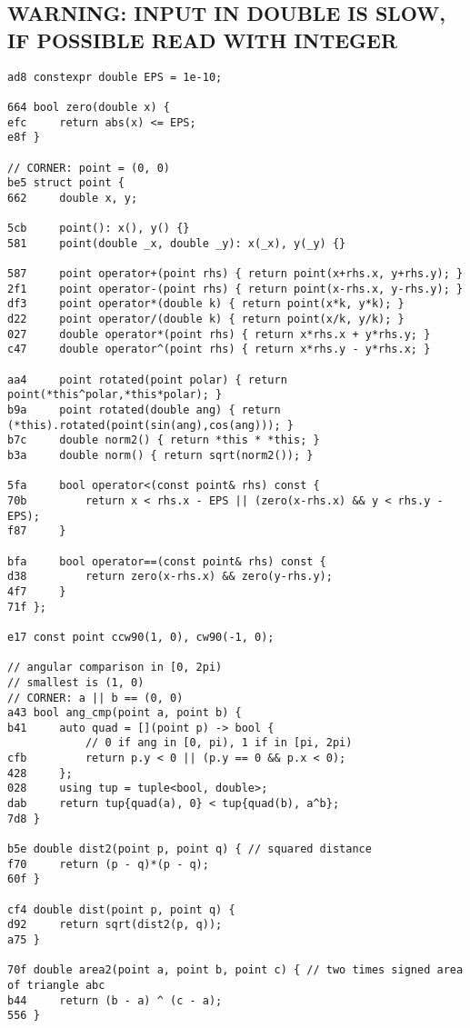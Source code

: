\documentclass[11pt, a4paper, twoside]{article}
\begin{document}
\subsection{WARNING: INPUT IN DOUBLE IS SLOW, IF POSSIBLE READ WITH INTEGER}
\begin{lstlisting}
ad8 constexpr double EPS = 1e-10;

664 bool zero(double x) {
efc 	return abs(x) <= EPS;
e8f }

// CORNER: point = (0, 0)
be5 struct point {
662 	double x, y;
    	
5cb 	point(): x(), y() {}
581 	point(double _x, double _y): x(_x), y(_y) {}
    	
587 	point operator+(point rhs) { return point(x+rhs.x, y+rhs.y); }
2f1 	point operator-(point rhs) { return point(x-rhs.x, y-rhs.y); }
df3 	point operator*(double k) { return point(x*k, y*k); }
d22 	point operator/(double k) { return point(x/k, y/k); }
027 	double operator*(point rhs) { return x*rhs.x + y*rhs.y; }
c47 	double operator^(point rhs) { return x*rhs.y - y*rhs.x; }
    
aa4 	point rotated(point polar) { return point(*this^polar,*this*polar); }
b9a 	point rotated(double ang) { return (*this).rotated(point(sin(ang),cos(ang))); }
b7c 	double norm2() { return *this * *this; }
b3a 	double norm() { return sqrt(norm2()); }
    
5fa 	bool operator<(const point& rhs) const {
70b 		return x < rhs.x - EPS || (zero(x-rhs.x) && y < rhs.y - EPS);
f87 	}
    
bfa 	bool operator==(const point& rhs) const {
d38 		return zero(x-rhs.x) && zero(y-rhs.y);
4f7 	}
71f };

e17 const point ccw90(1, 0), cw90(-1, 0);

// angular comparison in [0, 2pi)
// smallest is (1, 0)
// CORNER: a || b == (0, 0)
a43 bool ang_cmp(point a, point b) {
b41 	auto quad = [](point p) -> bool {
    		// 0 if ang in [0, pi), 1 if in [pi, 2pi)
cfb 		return p.y < 0 || (p.y == 0 && p.x < 0);
428 	};
028 	using tup = tuple<bool, double>;
dab 	return tup{quad(a), 0} < tup{quad(b), a^b};
7d8 }

b5e double dist2(point p, point q) { // squared distance
f70     return (p - q)*(p - q);
60f }

cf4 double dist(point p, point q) {
d92     return sqrt(dist2(p, q));
a75 }

70f double area2(point a, point b, point c) { // two times signed area of triangle abc
b44 	return (b - a) ^ (c - a);
556 }


\end{lstlisting}
\end{document}
